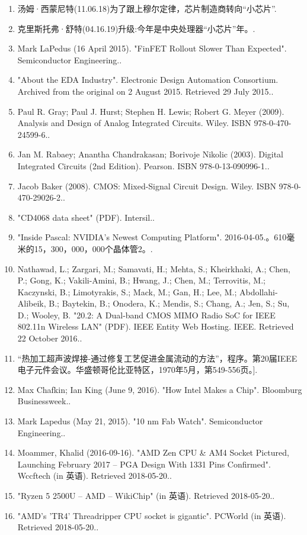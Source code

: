 \begin{enumerate}
\item 汤姆·西蒙尼特(11.06.18)为了跟上穆尔定律，芯片制造商转向“小芯片”.
\item 克里斯托弗·舒特(04.16.19)升级:今年是中央处理器“小芯片”年。.
\item Mark LaPedus (16 April 2015). "FinFET Rollout Slower Than Expected". Semiconductor Engineering..
\item "About the EDA Industry". Electronic Design Automation Consortium. Archived from the original on 2 August 2015. Retrieved 29 July 2015..
\item Paul R. Gray; Paul J. Hurst; Stephen H. Lewis; Robert G. Meyer (2009). Analysis and Design of Analog Integrated Circuits. Wiley. ISBN 978-0-470-24599-6..
\item Jan M. Rabaey; Anantha Chandrakasan; Borivoje Nikolic (2003). Digital Integrated Circuits (2nd Edition). Pearson. ISBN 978-0-13-090996-1..
\item Jacob Baker (2008). CMOS: Mixed-Signal Circuit Design. Wiley. ISBN 978-0-470-29026-2..
\item "CD4068 data sheet" (PDF). Intersil..
\item "Inside Pascal: NVIDIA's Newest Computing Platform". 2016-04-05.。610毫米的15，300，000，000个晶体管2。.
\item Nathawad, L.; Zargari, M.; Samavati, H.; Mehta, S.; Kheirkhaki, A.; Chen, P.; Gong, K.; Vakili-Amini, B.; Hwang, J.; Chen, M.; Terrovitis, M.; Kaczynski, B.; Limotyrakis, S.; Mack, M.; Gan, H.; Lee, M.; Abdollahi-Alibeik, B.; Baytekin, B.; Onodera, K.; Mendis, S.; Chang, A.; Jen, S.; Su, D.; Wooley, B. "20.2: A Dual-band CMOS MIMO Radio SoC for IEEE 802.11n Wireless LAN" (PDF). IEEE Entity Web Hosting. IEEE. Retrieved 22 October 2016..
\item “热加工超声波焊接-通过修复工艺促进金属流动的方法”，程序。第20届IEEE电子元件会议。华盛顿哥伦比亚特区，1970年5月，第549-556页。].
\item Max Chafkin; Ian King (June 9, 2016). "How Intel Makes a Chip". Bloomburg Businessweek..
\item Mark Lapedus (May 21, 2015). "10 nm Fab Watch". Semiconductor Engineering..
\item Moammer, Khalid (2016-09-16). "AMD Zen CPU & AM4 Socket Pictured, Launching February 2017 – PGA Design With 1331 Pins Confirmed". Wccftech (in 英语). Retrieved 2018-05-20..
\item "Ryzen 5 2500U – AMD – WikiChip" (in 英语). Retrieved 2018-05-20..
\item "AMD's 'TR4' Threadripper CPU socket is gigantic". PCWorld (in 英语). Retrieved 2018-05-20..

\end{enumerate}
